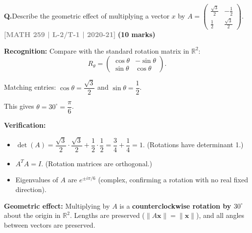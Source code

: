 \documentclass[12pt,a3paper]{article}
\newcommand{\yr}[1]{\hfill\textcolor{gray}{\small\textbf{[#1]}}}
\newcommand{\mk}[1]{\textcolor{orange!70!black}{\small\textbf{(#1 marks)}}}
\newcounter{qnum}
\newcommand{\Q}[1]{%
  \needspace{4\baselineskip}
  \refstepcounter{qnum}
  \vspace{6pt}
  \noindent\textbf{Q\theqnum.}\enspace #1\par
}
\begin{document}
\Q{Describe the geometric effect of multiplying a vector $x$ by $A = \begin{pmatrix} \frac{\sqrt{3}}{2} & -\frac{1}{2} \\ \frac{1}{2} & \frac{\sqrt{3}}{2} \end{pmatrix}$.
\yr{MATH 259 | L-2/T-1 | 2020-21} \mk{10}}


\begin{tcolorbox}[enhanced,breakable,
  colback=cF!4,colframe=cF,boxrule=0.8pt,arc=5pt,
  title={\textbf{Answer --- Geometric Effect of $A=\begin{pmatrix}\frac{\sqrt{3}}{2}&-\frac{1}{2}\\[3pt]\frac{1}{2}&\frac{\sqrt{3}}{2}\end{pmatrix}$}},
  fonttitle=\bfseries\color{white},colbacktitle=cF]

\textbf{Recognition:} Compare with the standard rotation matrix in $\mathbb{R}^2$:
\[
R_\theta=\begin{pmatrix}\cos\theta&-\sin\theta\\\sin\theta&\cos\theta\end{pmatrix}.
\]

Matching entries: $\cos\theta=\dfrac{\sqrt{3}}{2}$ and $\sin\theta=\dfrac{1}{2}$.

This gives $\theta=30^\circ=\dfrac{\pi}{6}$.

\textbf{Verification:}
\begin{itemize}[itemsep=2pt]
  \item $\det(A)=\dfrac{\sqrt{3}}{2}\cdot\dfrac{\sqrt{3}}{2}+\dfrac{1}{2}\cdot\dfrac{1}{2}=\dfrac{3}{4}+\dfrac{1}{4}=1$. (Rotations have determinant 1.) \checkmark
  \item $A^TA=I$. (Rotation matrices are orthogonal.) \checkmark
  \item Eigenvalues of $A$ are $e^{\pm i\pi/6}$ (complex, confirming a rotation with no real fixed direction). \checkmark
\end{itemize}

\textbf{Geometric effect:} Multiplying by $A$ is a \textbf{counterclockwise rotation by $30^\circ$} about the origin in $\mathbb{R}^2$. Lengths are preserved ($\|A\mathbf{x}\|=\|\mathbf{x}\|$), and all angles between vectors are preserved.

\end{tcolorbox}
\end{document}
